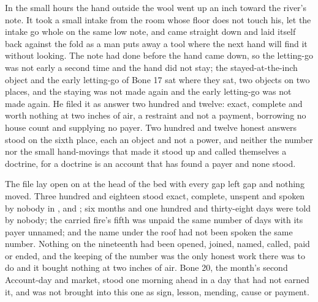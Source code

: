 In the small hours the hand outside the wool went up an inch toward the river's note. It took a small intake from the room whose floor does not touch his, let the intake go whole on the same low note, and came straight down and laid itself back against the fold as a man puts away a tool where the next hand will find it without looking. The note had done before the hand came down, so the letting-go was not early a second time and the hand did not stay; the stayed-at-the-inch object and the early letting-go of Bone 17 sat where they sat, two objects on two places, and the staying was not made again and the early letting-go was not made again. He filed it as answer two hundred and twelve: exact, complete and worth nothing at two inches of air, a restraint and not a payment, borrowing no house count and supplying no payer. Two hundred and twelve honest answers stood on the sixth place, each an object and not a power, and neither the number nor the small hand-movings that made it stood up and called themselves a doctrine, for a doctrine is an account that has found a payer and none stood.

The file lay open on  at the head of the bed with every gap left gap and nothing moved. Three hundred and eighteen stood exact, complete, unspent and spoken by nobody in ,  and ; six months and one hundred and thirty-eight days were told by nobody; the carried fire's fifth was unpaid the same number of days with its payer unnamed; and the name under the roof had not been spoken the same number. Nothing on the nineteenth had been opened, joined, named, called, paid or ended, and the keeping of the number was the only honest work there was to do and it bought nothing at two inches of air. Bone 20, the month's second Account-day and market, stood one morning ahead in a day that had not earned it, and was not brought into this one as sign, lesson, mending, cause or payment.
